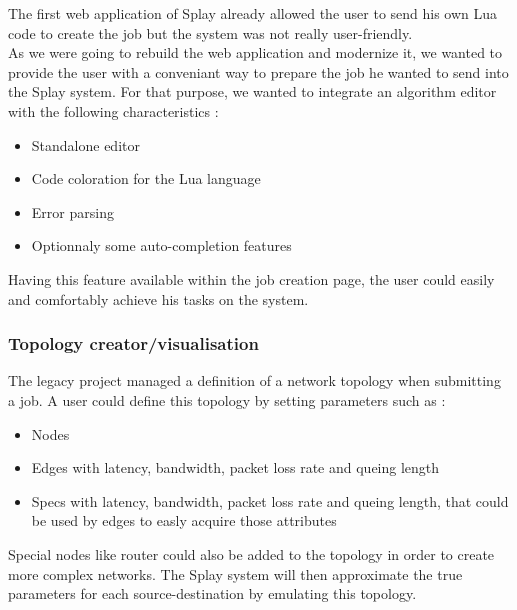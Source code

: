 \documentclass{eplmastersthesis}
\begin{document}
          The first web application of Splay already allowed the user to send
          his own Lua code to create the job but the system was not really
          user-friendly.\\

          As we were going to rebuild the web application and modernize it,
          we wanted to provide the user with a conveniant way to prepare
          the job he wanted to send into the Splay system. For that purpose,
          we wanted to integrate an algorithm editor with the following
          characteristics :

          \begin{itemize}
            \item Standalone editor
            \item Code coloration for the Lua language
            \item Error parsing
            \item Optionnaly some auto-completion features
          \end{itemize}

          Having this feature available within the job creation page, the user
          could easily and comfortably achieve his tasks on the system.

        \subsubsection{Topology creator/visualisation}

          The legacy project managed a definition of a network topology when
          submitting a job. A user could define this topology by setting
          parameters such as :

          \begin{itemize}
            \item Nodes
            \item Edges with latency, bandwidth, packet loss rate and queing
            length
            \item Specs with latency, bandwidth, packet loss rate and queing
            length, that could be used by edges to easly acquire those
            attributes
          \end{itemize}

          Special nodes like router could also be added to the topology in order
          to create more complex networks. The Splay system will then
          approximate the true parameters for each source-destination by
          emulating this topology.\\
\end{document}
